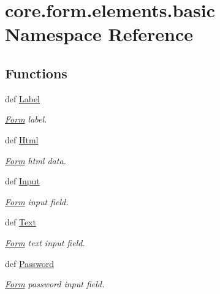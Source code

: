 \hypertarget{namespacecore_1_1form_1_1elements_1_1basic}{\section{core.\-form.\-elements.\-basic Namespace Reference}
\label{namespacecore_1_1form_1_1elements_1_1basic}
}
\subsection*{Functions}
\begin{DoxyCompactItemize}
\item 
def \hyperlink{namespacecore_1_1form_1_1elements_1_1basic_ac73a7e35f5cf9e809b6d980b0a809d75}{Label}
\begin{DoxyCompactList}\small\item\em \hyperlink{classcore_1_1form_1_1Form}{Form} label. \end{DoxyCompactList}\item 
def \hyperlink{namespacecore_1_1form_1_1elements_1_1basic_a230835759e7fa36cc14e76a2af0b7b21}{Html}
\begin{DoxyCompactList}\small\item\em \hyperlink{classcore_1_1form_1_1Form}{Form} html data. \end{DoxyCompactList}\item 
def \hyperlink{namespacecore_1_1form_1_1elements_1_1basic_a91d864a06c43843edd5da069533d8a66}{Input}
\begin{DoxyCompactList}\small\item\em \hyperlink{classcore_1_1form_1_1Form}{Form} input field. \end{DoxyCompactList}\item 
def \hyperlink{namespacecore_1_1form_1_1elements_1_1basic_a48a218780273276e6e19743c7b23632a}{Text}
\begin{DoxyCompactList}\small\item\em \hyperlink{classcore_1_1form_1_1Form}{Form} text input field. \end{DoxyCompactList}\item 
def \hyperlink{namespacecore_1_1form_1_1elements_1_1basic_add6ec370fc73d8324ce416ab48be1e60}{Password}
\begin{DoxyCompactList}\small\item\em \hyperlink{classcore_1_1form_1_1Form}{Form} password input field. \end{DoxyCompactList}\item 

\end{DoxyCompactItemize}
